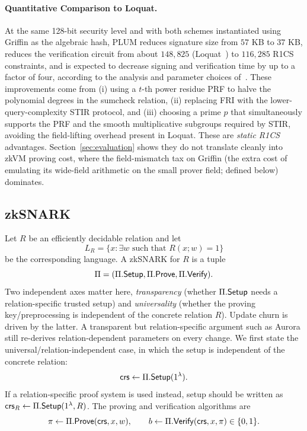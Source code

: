 \paragraph{Quantitative Comparison to Loquat.}
At the same 128-bit security level and with both schemes instantiated using Griffin as the algebraic hash, PLUM reduces signature size from \(57\) KB to \(37\) KB, reduces the verification circuit from about \(148{,}825\) (Loquat~\cite{cryptoeprint:2024/868}) to \(116{,}285\) R1CS constraints, and is expected to decrease signing and verification time by up to a factor of four, according to the analysis and parameter choices of~\cite{10.1007/978-981-95-2961-2_6}.
These improvements come from (i) using a \(t\)-th power residue PRF to halve the polynomial degrees in the sumcheck relation, (ii) replacing FRI with the lower-query-complexity STIR protocol, and (iii) choosing a prime \(p\) that simultaneously supports the PRF and the smooth multiplicative subgroups required by STIR, avoiding the field-lifting overhead present in Loquat. These are \emph{static R1CS} advantages. Section~\ref{sec:evaluation} shows they do not translate cleanly into zkVM proving cost, where the field-mismatch tax on Griffin (the extra cost of emulating its wide-field arithmetic on the small prover field; defined below) dominates.

\subsection{zkSNARK}
Let $R$ be an efficiently decidable relation and let
\begin{equation*}
  L_R=\{x:\exists w \text{ such that } R(x;w)=1\}
\end{equation*}
be the corresponding language. A zkSNARK for $R$ is a tuple
\begin{equation*}
  \Pi=(\Pi.\mathsf{Setup},\Pi.\mathsf{Prove},\Pi.\mathsf{Verify}).
\end{equation*}
Two independent axes matter here, \emph{transparency} (whether $\Pi.\mathsf{Setup}$ needs a relation-specific trusted setup) and \emph{universality} (whether the proving key/preprocessing is independent of the concrete relation $R$). Update churn is driven by the latter. A transparent but relation-specific argument such as Aurora still re-derives relation-dependent parameters on every change. We first state the universal/relation-independent case, in which the setup is independent of the concrete relation:
\begin{equation*}
  \mathsf{crs}\leftarrow \Pi.\mathsf{Setup}(1^\lambda).
\end{equation*}
If a relation-specific proof system is used instead, setup should be written as $\mathsf{crs}_R\leftarrow\Pi.\mathsf{Setup}(1^\lambda,R)$. The proving and verification algorithms are
\begin{equation*}
  \pi\leftarrow \Pi.\mathsf{Prove}(\mathsf{crs},x,w),
  \qquad
  b\leftarrow \Pi.\mathsf{Verify}(\mathsf{crs},x,\pi)\in\{0,1\}.
\end{equation*}

